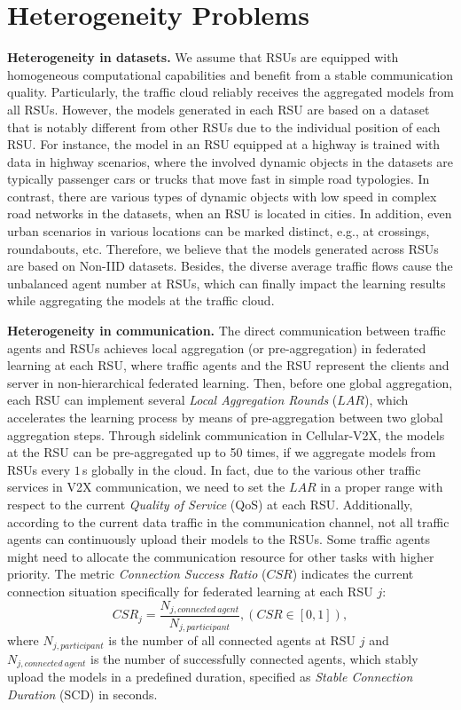 \section{Heterogeneity Problems}
\label{sec:problem_formulation}



\noindent  \textbf{Heterogeneity in datasets.} 
We assume that RSUs are equipped with homogeneous computational capabilities and benefit from a stable communication quality. Particularly, the traffic cloud reliably receives the aggregated models from all RSUs. However, the models generated in each RSU are based on a dataset that is notably different from other RSUs due to the individual position of each RSU. For instance, the model in an RSU equipped at a highway is trained with data in highway scenarios, where the involved dynamic objects in the datasets are typically passenger cars or trucks that move fast in simple road typologies. In contrast, there are various types of dynamic objects with low speed in complex road networks in the datasets, when an RSU is located in cities. In addition, even urban scenarios in various locations can be marked distinct, e.g., at crossings, roundabouts, etc. Therefore, we believe that the models generated across RSUs are based on Non-IID datasets. Besides, the diverse average traffic flows cause the unbalanced agent number at RSUs, which can finally impact the learning results while aggregating the models at the traffic cloud. 

\noindent  \textbf{Heterogeneity in communication.} 
The direct communication between traffic agents and RSUs achieves local aggregation (or pre-aggregation) in federated learning at each RSU, where traffic agents and the RSU represent the clients and server in non-hierarchical federated learning. Then, before one global aggregation, each RSU can implement several \emph{Local Aggregation Rounds} ($LAR$), which accelerates the learning process by means of pre-aggregation between two global aggregation steps. Through sidelink communication in Cellular-V2X, %
the models at the RSU can be pre-aggregated up to 50 times, if we aggregate models from RSUs every $1$\,s globally in the cloud. In fact, due to the various other traffic services in V2X communication, we need to set the $LAR$ in a proper range with respect to the current \emph{Quality of Service} (QoS) at each RSU. Additionally, according to the current data traffic in the communication channel, not all traffic agents can continuously upload their models to the RSUs. Some traffic agents might need to allocate the communication resource for other tasks with higher priority. The metric \emph{Connection Success Ratio} ($CSR$) indicates the current connection situation specifically for federated learning at each RSU $j$:
\begin{equation}
    \label{Eq:measurement}
    CSR_j = \frac{N_{j,{connected\: agent}}}{N_{j,{participant}}}, (CSR \in [0,1]),
\end{equation}
where $N_{j,{participant}}$ is the number of all connected agents at RSU $j$ and $N_{j,{connected\:agent}}$ is the number of successfully connected agents, which stably upload the models in a predefined duration, specified as \emph{Stable Connection Duration} (SCD) in seconds.

